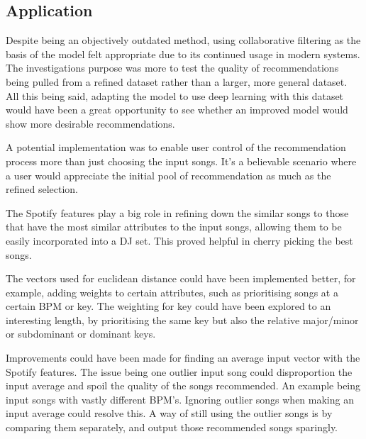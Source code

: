 \subsection{Application}
Despite being an objectively outdated method, using collaborative filtering as the basis of the model felt appropriate due to its continued usage in modern systems. The investigations purpose was more to test the quality of recommendations being pulled from a refined dataset rather than a larger, more general dataset. All this being said, adapting the model to use deep learning with this dataset would have been a great opportunity to see whether an improved model would show more desirable recommendations.

A potential implementation was to enable user control of the recommendation process more than just choosing the input songs. It's a believable scenario where a user would appreciate the initial pool of recommendation as much as the refined selection.

The Spotify features play a big role in refining down the similar songs to those that have the most similar attributes to the input songs, allowing them to be easily incorporated into a DJ set. This proved helpful in cherry picking the best songs. 

The vectors used for euclidean distance could have been implemented better, for example, adding weights to certain attributes, such as prioritising songs at a certain BPM or key. The weighting for key could have been explored to an interesting length, by prioritising the same key but also the relative major/minor or subdominant or dominant keys.

Improvements could have been made for finding an average input vector with the Spotify features. The issue being one outlier input song could disproportion the input average and spoil the quality of the songs recommended. An example being input songs with vastly different BPM's. Ignoring outlier songs when making an input average could resolve this. A way of still using the outlier songs is by comparing them separately, and output those recommended songs sparingly.

